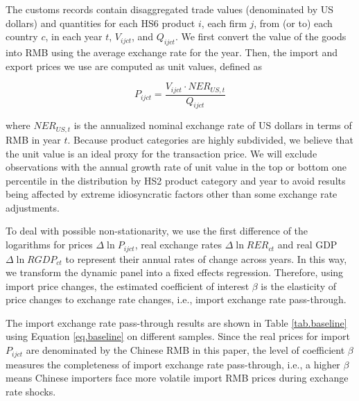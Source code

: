 \documentclass[12pt]{article}
\begin{document}
The customs records contain disaggregated trade values (denominated by US dollars) and quantities for each HS6 product $i$, each firm $j$, from (or to) each country $c$, in each year $t$, $V_{ijct}$, and $Q_{ijct}$. We first convert the value of the goods into RMB using the average exchange rate for the year. Then, the import and export prices we use are computed as unit values, defined as 

$$
P_{ijct}=\frac{V_{ijct}\cdot NER_{US,t}}{Q_{ijct}}
$$

where $NER_{US,t}$ is the annualized nominal exchange rate of US dollars in terms of RMB in year $t$. Because product categories are highly subdivided, we believe that the unit value is an ideal proxy for the transaction price. We will exclude observations with the annual growth rate of unit value in the top or bottom one percentile in the distribution by HS2 product category and year to avoid results being affected by extreme idiosyncratic factors other than some exchange rate adjustments.

To deal with possible non-stationarity, we use the first difference of the logarithms for prices $\Delta \ln P_{i j c t}$, real exchange rates $\Delta \ln R E R_{c t}$ and real GDP $\Delta \ln R G D P_{c t}$ to represent their annual rates of change across years. In this way, we transform the dynamic panel into a fixed effects regression. Therefore, using import price changes, the estimated coefficient of interest $\beta$ is the elasticity of price changes to exchange rate changes, i.e., import exchange rate pass-through.

The import exchange rate pass-through results are shown in Table \ref{tab.baseline} using Equation \ref{eq.baseline} on different samples. Since the real prices for import $P_{i j c t}$ are denominated by the Chinese RMB in this paper, the level of coefficient $\beta$ measures the completeness of import exchange rate pass-through, i.e., a higher $\beta$ means Chinese importers face more volatile import RMB prices during exchange rate shocks. 
\end{document}
